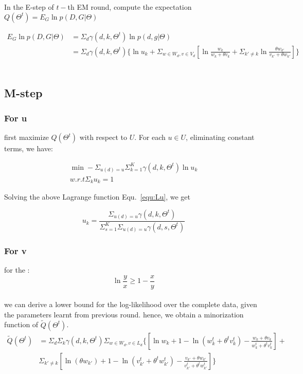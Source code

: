\documentclass{article}
\begin{document}
 In the E-step of $t-$th  EM round, compute the expectation $Q(\Theta^t)=E_{G} \ln p(D,G|\Theta) $

\begin{equation}
\begin{aligned}
E_{G} \ln p(D,G|\Theta)  &= \Sigma_d \gamma(d,k,\Theta^t)\ln p(d,g|\Theta)\\\nonumber
& = \Sigma_d \gamma(d,k,\Theta^t) \{ \ln u_k + \Sigma_{w\in W_d, v\in V_d} [\ln \frac{w_k}{w_k +\theta v_k} +\Sigma_{k'\neq k} \ln \frac{\theta w_{k'}}{v_{k'}+\theta w_{k'}}]\}
\end{aligned}
\end{equation}
\\
\subsection{M-step}

\subsubsection{For u}
first maximize $Q(\Theta^t)$ with respect to $U$. For each $u \in U$, eliminating constant terms, we have:

\begin{align}\label{equ:Lu}
\min -\Sigma_{u(d)=u} \Sigma_{k=1}^K \gamma(d,k,\Theta^t) \ln u_k\\ \nonumber
w.r.t \Sigma_k u_k =1
\end{align}

Solving the above Lagrange function Equ.~\ref{equ:Lu}, we get

\begin{equation}\label{equ:u}
u_k =\frac{\Sigma_{u(d)=u}\gamma(d,k,\Theta^t)}{\Sigma_{s=1}^K \Sigma_{u(d)=u}\gamma(d,s,\Theta^t)}
\end{equation}

\subsubsection{For v}
for the :
\begin{equation*}
\ln \frac{y}{x} \geq 1- \frac{x}{y}
\end{equation*}\\
we can derive a lower bound for the log-likelihood over the complete data, given the parameters learnt from previous round.
hence, we obtain a minorization function of $\tilde{Q}(\Theta^t)$.\\
\begin{equation}
\begin{aligned}
\tilde{Q}(\Theta^t) &= \Sigma_d \Sigma_k \gamma(d,k,\Theta^t) \Sigma_{w\in W_d, v\in L_d}  \{ [\ln w_k + 1 - \ln (w_k^t + \theta^t v_k^t) - \frac{w_k+\theta v_k}{w_k^t + \theta^tv_k^t}]+\\\nonumber
&\Sigma_{k'\neq k} [\ln (\theta w_{k'}) + 1 - \ln (v_{k'}^t + \theta^t w_{k'}^t) -  \frac{v_{k'}+\theta w_{k'}}{v_{k'}^t + \theta^t w_{k'}^t}]
\}
\end{aligned}
\end{equation}
\end{document}
